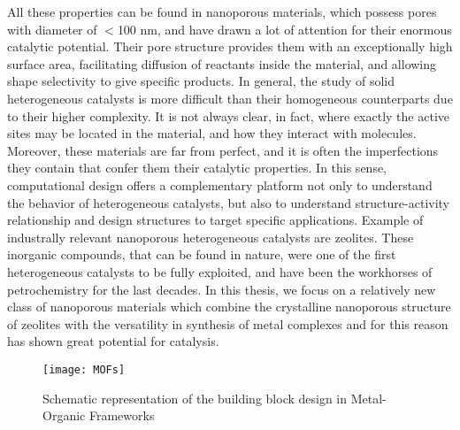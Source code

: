 \npar
All these properties can be found in nanoporous materials, which possess pores with diameter of $<$100 nm\cite{mcnaught1997compendium}, and have drawn a lot of attention for their enormous catalytic potential. Their pore structure provides them with an exceptionally high surface area, facilitating diffusion of reactants inside the material, and allowing shape selectivity to give specific products. In general, the study of solid heterogeneous catalysts is more difficult than their homogeneous counterparts due to their higher complexity. It is not always clear, in fact, where exactly the active sites may be located in the material, and how they interact with molecules. Moreover, these materials are far from perfect, and it is often the imperfections they contain that confer them their catalytic properties. In this sense, computational design offers a complementary platform not only to understand the behavior of heterogeneous catalysts, but also to understand structure-activity relationship and design structures to target specific applications. Example of industrally relevant nanoporous heterogeneous catalysts are zeolites. These inorganic compounds, that can be found in nature, were one of the first heterogeneous catalysts to be fully exploited, and have been the workhorses of petrochemistry for the last decades. 
\npar
In this thesis, we focus on a relatively new class of nanoporous materials which combine the crystalline nanoporous structure of zeolites with the versatility in synthesis of metal complexes and for this reason has shown great potential for catalysis.

\begin{figure}[!htbp]
	\centering
 	\texttt{[image: MOFs]}
	\caption{Schematic representation of the building block design in Metal-Organic Frameworks}
	\label{fig:MOFs}
\end{figure}


